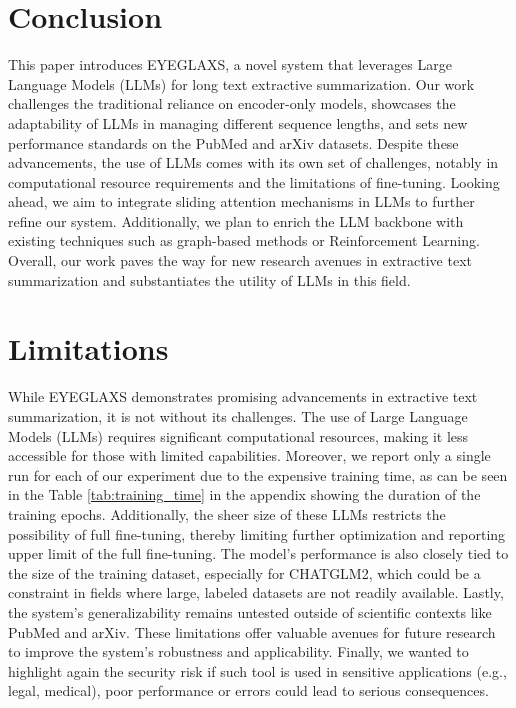 \section{Conclusion}

This paper introduces EYEGLAXS, a novel system that leverages Large Language Models (LLMs) for long text extractive summarization. Our work challenges the traditional reliance on encoder-only models, showcases the adaptability of LLMs in managing different sequence lengths, and sets new performance standards on the PubMed and arXiv datasets. Despite these advancements, the use of LLMs comes with its own set of challenges, notably in computational resource requirements and the limitations of fine-tuning. Looking ahead, we aim to integrate sliding attention mechanisms in LLMs to further refine our system. Additionally, we plan to enrich the LLM backbone with existing techniques such as graph-based methods or Reinforcement Learning. Overall, our work paves the way for new research avenues in extractive text summarization and substantiates the utility of LLMs in this field.

\section{Limitations}
While EYEGLAXS demonstrates promising advancements in extractive text summarization, it is not without its challenges. The use of Large Language Models (LLMs) requires significant computational resources, making it less accessible for those with limited capabilities. Moreover, we report only a single run for each of our experiment due to the expensive training time, as can be seen in the Table \ref{tab:training_time} in the appendix showing the duration of the training epochs. Additionally, the sheer size of these LLMs restricts the possibility of full fine-tuning, thereby limiting further optimization and reporting upper limit of the full fine-tuning. The model's performance is also closely tied to the size of the training dataset, especially for CHATGLM2, which could be a constraint in fields where large, labeled datasets are not readily available. Lastly, the system's generalizability remains untested outside of scientific contexts like PubMed and arXiv. These limitations offer valuable avenues for future research to improve the system's robustness and applicability. Finally, we wanted to highlight again the security risk if such tool is used in sensitive applications (e.g., legal, medical), poor performance or errors could lead to serious consequences.

